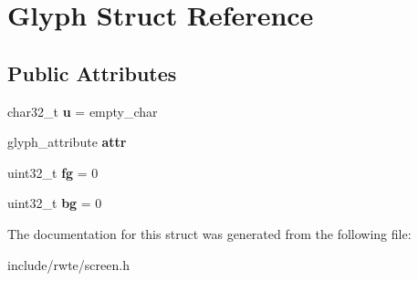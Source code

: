 \hypertarget{structGlyph}{}\section{Glyph Struct Reference}
\label{structGlyph}
\subsection*{Public Attributes}
\begin{DoxyCompactItemize}
\item 
\mbox{\label{structGlyph_a3c4d9f2933934bdb5225a10a12e0896e}} 
char32\+\_\+t {\bfseries u} = empty\+\_\+char
\item 
\mbox{\label{structGlyph_ad1dc925b393246fb53987f90921f859a}} 
glyph\+\_\+attribute {\bfseries attr}
\item 
\mbox{\label{structGlyph_a82d9824d8c0314cf0afc67bee2df4705}} 
uint32\+\_\+t {\bfseries fg} = 0
\item 
\mbox{\label{structGlyph_a3cddc8b2db448bfff7bc61e671b401a7}} 
uint32\+\_\+t {\bfseries bg} = 0
\end{DoxyCompactItemize}


The documentation for this struct was generated from the following file\+:\begin{DoxyCompactItemize}
\item 
include/rwte/screen.\+h\end{DoxyCompactItemize}
